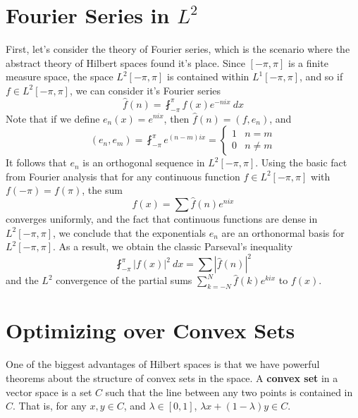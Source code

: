 \section{Fourier Series in $L^2$}

First, let's consider the theory of Fourier series, which is the scenario where the abstract theory of Hilbert spaces found it's place. Since $[-\pi,\pi]$ is a finite measure space, the space $L^2[-\pi,\pi]$ is contained within $L^1[-\pi,\pi]$, and so if $f \in L^2[-\pi,\pi]$, we can consider it's Fourier series
%
\[ \widehat{f}(n) = \fint_{-\pi}^\pi f(x) e^{-nix}\ dx \]
%
Note that if we define $e_n(x) = e^{nix}$, then $\widehat{f}(n) = (f,e_n)$, and
%
\[ (e_n,e_m) = \fint_{-\pi}^\pi e^{(n-m)ix} = \begin{cases} 1 & n = m \\ 0 & n \neq m \end{cases} \]
%
It follows that $e_n$ is an orthogonal sequence in $L^2[-\pi,\pi]$. Using the basic fact from Fourier analysis that for any continuous function $f \in L^2[-\pi,\pi]$ with $f(-\pi) = f(\pi)$, the sum
%
\[ f(x) = \sum \widehat{f}(n) e^{nix} \]
%
converges uniformly, and the fact that continuous functions are dense in $L^2[-\pi,\pi]$, we conclude that the exponentials $e_n$ are an orthonormal basis for $L^2[-\pi,\pi]$. As a result, we obtain the classic Parseval's inequality
%
\[ \fint_{-\pi}^\pi |f(x)|^2\ dx = \sum |\widehat{f}(n)|^2 \]
%
and the $L^2$ convergence of the partial sums $\sum_{k = -N}^N \widehat{f}(k) e^{kix}$ to $f(x)$.

\section{Optimizing over Convex Sets}

One of the biggest advantages of Hilbert spaces is that we have powerful theorems about the structure of convex sets in the space. A {\bf convex set} in a vector space is a set $C$ such that the line between any two points is contained in $C$. That is, for any $x, y \in C$, and $\lambda \in [0,1]$, $\lambda x + (1 - \lambda) y \in C$.

